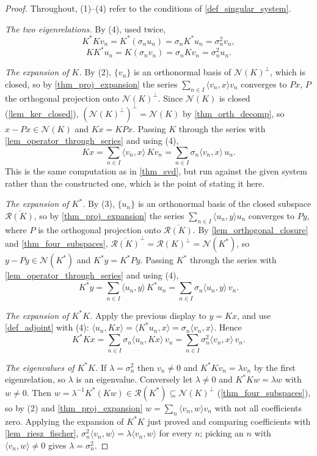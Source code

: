\documentclass[a4paper]{report}
\theoremstyle{plain}
\theoremstyle{definition}
\theoremstyle{remark}
\begin{document}
\begin{proof}
  Throughout, (1)--(4) refer to the conditions of \cref{def_singular_system}.

  \emph{The two eigenrelations.}  By (4), used twice,
  \[
    K^*Kv_n = K^*(\sigma_nu_n) = \sigma_nK^*u_n = \sigma_n^2v_n,
  \]
  \[
    KK^*u_n = K(\sigma_nv_n) = \sigma_nKv_n = \sigma_n^2u_n .
  \]

  \emph{The expansion of $K$.}  By (2), $\{v_n\}$ is an orthonormal basis of
  $\mathcal{N}(K)^\perp$, which is closed, so by \cref{thm_proj_expansion} the series
  $\sum_{n\in I}\langle v_n,x\rangle v_n$ converges to $Px$, $P$ the orthogonal projection
  onto $\mathcal{N}(K)^\perp$.  Since $\mathcal{N}(K)$ is closed (\cref{lem_ker_closed}),
  $(\mathcal{N}(K)^\perp)^\perp = \mathcal{N}(K)$ by \cref{thm_orth_decomp}, so
  $x - Px \in \mathcal{N}(K)$ and $Kx = KPx$.  Passing $K$ through the series with
  \cref{lem_operator_through_series} and using (4),
  \[
    Kx = \sum_{n\in I}\langle v_n,x\rangle\,Kv_n
       = \sum_{n\in I}\sigma_n\langle v_n,x\rangle\,u_n .
  \]
  This is the same computation as in \cref{thm_svd}, but run against the given system
  rather than the constructed one, which is the point of stating it here.

  \emph{The expansion of $K^*$.}  By (3), $\{u_n\}$ is an orthonormal basis of the closed
  subspace $\overline{\mathcal{R}(K)}$, so by \cref{thm_proj_expansion} the series
  $\sum_{n\in I}\langle u_n,y\rangle u_n$ converges to $Py$, where $P$ is the orthogonal
  projection onto $\overline{\mathcal{R}(K)}$.  By \cref{lem_orthogonal_closure} and
  \cref{thm_four_subspaces},
  $\overline{\mathcal{R}(K)}^\perp = \mathcal{R}(K)^\perp = \mathcal{N}(K^*)$, so
  $y - Py \in \mathcal{N}(K^*)$ and $K^*y = K^*Py$.  Passing $K^*$ through the series with
  \cref{lem_operator_through_series} and using (4),
  \[
    K^*y = \sum_{n\in I}\langle u_n,y\rangle\,K^*u_n
         = \sum_{n\in I}\sigma_n\langle u_n,y\rangle\,v_n .
  \]

  \emph{The expansion of $K^*K$.}  Apply the previous display to $y = Kx$, and use
  \cref{def_adjoint} with (4): $\langle u_n,Kx\rangle = \langle K^*u_n,x\rangle =
  \sigma_n\langle v_n,x\rangle$.  Hence
  \[
    K^*Kx = \sum_{n\in I}\sigma_n\langle u_n,Kx\rangle\,v_n
          = \sum_{n\in I}\sigma_n^2\langle v_n,x\rangle\,v_n .
  \]

  \emph{The eigenvalues of $K^*K$.}  If $\lambda = \sigma_n^2$ then $v_n \ne 0$ and
  $K^*Kv_n = \lambda v_n$ by the first eigenrelation, so $\lambda$ is an eigenvalue.
  Conversely let $\lambda \ne 0$ and $K^*Kw = \lambda w$ with $w \ne 0$.  Then
  $w = \lambda^{-1}K^*(Kw) \in \mathcal{R}(K^*) \subseteq \mathcal{N}(K)^\perp$
  (\cref{thm_four_subspaces}), so by (2) and \cref{thm_proj_expansion}
  $w = \sum_{n}\langle v_n,w\rangle v_n$ with not all coefficients zero.  Applying the
  expansion of $K^*K$ just proved and comparing coefficients with
  \cref{lem_riesz_fischer}, $\sigma_n^2\langle v_n,w\rangle = \lambda\langle v_n,w\rangle$
  for every $n$; picking an $n$ with $\langle v_n,w\rangle \ne 0$ gives
  $\lambda = \sigma_n^2$.


\end{proof}
\end{document}
